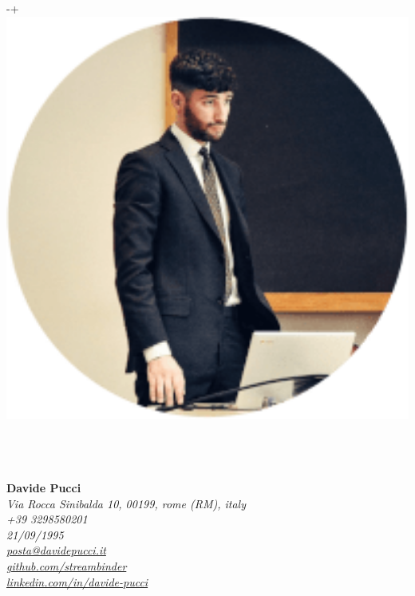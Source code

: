 \documentclass{article}
\begin{document}

\begin{minipage}[t]{.25\textwidth}
	\raisebox
	{\dimexpr-\height+\ht\strutbox\relax}
	{\includegraphics[width=1\textwidth]{profile.png}} \hfill \\\\\\\\
\end{minipage}
\begin{minipage}[t]{.7\textwidth}
	\begin{flushright}
		\vfill \textbf{\huge{Davide Pucci}} \\ \hfill \vfill
		\textit{
			Via Rocca Sinibalda 10, 00199, {{rome}} (RM), {{italy}} \hspace{1mm} \color{lightergray}\faHome\color{black} \\
			+39 3298580201 \hspace{1mm} \color{lightergray}\faPhone\color{black} \\
			21/09/1995 \hspace{1mm} \color{lightergray}\faCalendar\color{black} \\
			\href{mailto:posta@davidepucci.it}{posta@davidepucci.it} \hspace{1mm} \color{lightergray}\faEnvelope\color{black} \\
			\href{https://github.com/streambinder}{github.com/streambinder} \hspace{1mm} \color{lightergray}\faGithubSquare\color{black} \\
			\href{https://linkedin.com/in/davide-pucci}{linkedin.com/in/davide-pucci} \hspace{1mm} \color{lightergray}\faLinkedinSquare\color{black} \\
		}
	\end{flushright}
\end{minipage}
\end{document}
